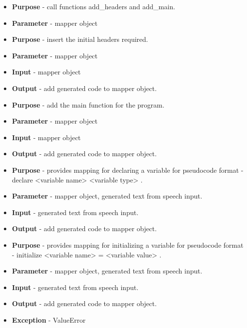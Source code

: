 \documentclass[12pt]{article}
\newcounter{subsubsubsection}[subsubsection]
\begin{document}
\begin{itemize}
    \setlength{\itemsep}{1pt}
    \item \textbf{Purpose} - call functions add\_headers and add\_main.
    \item \textbf{Parameter} -  mapper object
\end{itemize}

\begin{itemize}
    \setlength{\itemsep}{1pt}
    \item \textbf{Purpose} - insert the initial headers required.
    \item \textbf{Parameter} -  mapper object
    \item \textbf{Input} -  mapper object
    \item \textbf{Output} - add generated code to mapper object.
\end{itemize}

\begin{itemize}
    \setlength{\itemsep}{1pt}
    \item \textbf{Purpose} - add the main function for the program.
    \item \textbf{Parameter} -  mapper object
    \item \textbf{Input} -  mapper object
    \item \textbf{Output} - add generated code to mapper object.
\end{itemize}

\begin{itemize}
    \setlength{\itemsep}{1pt}
    \item \textbf{Purpose} - provides mapping for declaring a variable for pseudocode format - declare <variable name> <variable type> .
    \item \textbf{Parameter} - mapper object, generated text from speech input.
    \item \textbf{Input} - generated text from speech input.
    \item \textbf{Output} - add generated code to mapper object.
\end{itemize}

\begin{itemize}
    \setlength{\itemsep}{1pt}
    \item \textbf{Purpose} - provides mapping for initializing a variable for pseudocode format - initialize <variable name> = <variable value> .
    \item \textbf{Parameter} - mapper object, generated text from speech input.
    \item \textbf{Input} - generated text from speech input.
    \item \textbf{Output} - add generated code to mapper object.
    \item \textbf{Exception} - ValueError
\end{itemize}
\end{document}
